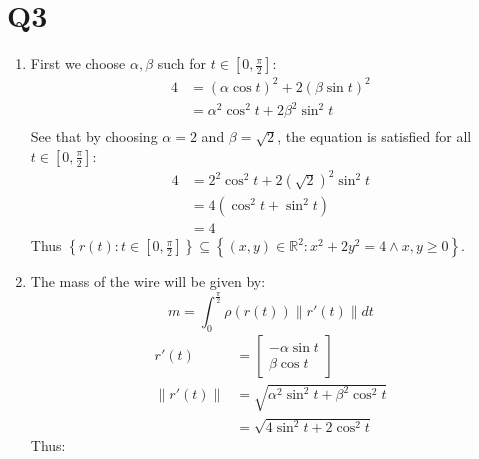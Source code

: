 \documentclass[a4paper, 11pt]{article}
\newcommand{\RR}{\mathbb{R}}
\def\set#1{\left\{ #1 \right\}}
\begin{document}
\section*{Q3}
\begin{enumerate}[label=(\alph*)]
  \item First we choose $\alpha,\beta$ such for $t\in[0,\frac\pi2]$:
        \begin{align*}
          4 & = (\alpha\cos t)^2 + 2(\beta\sin t)^2  \\
            & = \alpha^2\cos^2 t  + 2\beta^2\sin^2 t \\
        \end{align*}
        See that by choosing $\alpha=2$ and $\beta=\sqrt 2$, the equation is satisfied for all $t\in[0,\frac\pi 2]$:
        \begin{align*}
          4 & = 2^2 \cos^2t + 2(\sqrt 2)^2\sin^2 t \\
            & = 4(\cos^2 t+\sin^2 t)               \\
            & = 4
        \end{align*}
        Thus $\set{r(t): t\in [0,\frac \pi2] }\subseteq \set{(x,y)\in\RR^2 : x^2 + 2y^2 = 4 \land x,y\geq0}$.




  \item The mass of the wire will be given by:
        $$m = \int_0^{\frac{\pi}2}\rho(r(t))\|r'(t)\|dt$$
        \begin{align*}
          r'(t)     & = \begin{bmatrix}
                          -\alpha\sin t \\
                          \beta \cos t
                        \end{bmatrix}                           \\
          \|r'(t)\| & = \sqrt{\alpha^2\sin^2t + \beta^2\cos^2 t} \\
                    & =\sqrt{4\sin^2t + 2\cos^2 t}
        \end{align*}
        Thus:


\end{enumerate}
\end{document}
